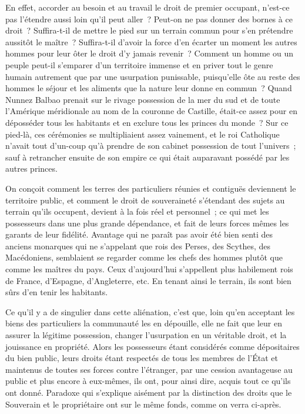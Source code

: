 \documentclass[french,twoside]{book} %
\begin{document}
En effet, accorder au besoin et au travail le droit de premier occupant, n’est-ce pas l’étendre aussi loin qu’il peut aller ? Peut-on ne pas donner des bornes à ce droit ? Suffira-t-il de mettre le pied sur un terrain commun pour s’en prétendre aussitôt le maître ? Suffira-t-il d’avoir la force d’en écarter un moment les autres hommes pour leur ôter le droit d’y jamais revenir ? Comment un homme ou un peuple peut-il s’emparer d’un territoire immense et en priver tout le genre humain autrement que par une usurpation punissable, puisqu’elle ôte au reste des hommes le séjour et les aliments que la nature leur donne en commun ? Quand Nunnez Balbao prenait sur le rivage possession de la mer du sud et de toute l’Amérique méridionale au nom de la couronne de Castille, était-ce assez pour en déposséder tous les habitants et en exclure tous les princes du monde ? Sur ce pied-là, ces cérémonies se multipliaient assez vainement, et le roi Catholique n’avait tout d’un-coup qu’à prendre de son cabinet possession de tout l’univers ; sauf à retrancher ensuite de son empire ce qui était auparavant possédé par les autres princes.\par
On conçoit comment les terres des particuliers réunies et contiguës deviennent le territoire public, et comment le droit de souveraineté s’étendant des sujets au terrain qu’ils occupent, devient à la fois réel et personnel ; ce qui met les possesseurs dans une plus grande dépendance, et fait de leurs forces mêmes les garants de leur fidélité. Avantage qui ne paraît pas avoir été bien senti des anciens monarques qui ne s’appelant que rois des Perses, des Scythes, des Macédoniens, semblaient se regarder comme les chefs des hommes plutôt que comme les maîtres du pays. Ceux d’aujourd’hui s’appellent plus habilement rois de France, d’Espagne, d’Angleterre, etc. En tenant ainsi le terrain, ils sont bien sûrs d’en tenir les habitants.\par
Ce qu’il y a de singulier dans cette aliénation, c’est que, loin qu’en acceptant les biens des particuliers la communauté les en dépouille, elle ne fait que leur en assurer la légitime possession, changer l’usurpation en un véritable droit, et la jouissance en propriété. Alors les possesseurs étant considérés comme dépositaires du bien public, leurs droits étant respectés de tous les membres de l’État et maintenus de toutes ses forces contre l’étranger, par une cession avantageuse au public et plus encore à eux-mêmes, ils ont, pour ainsi dire, acquis tout ce qu’ils ont donné. Paradoxe qui s’explique aisément par la distinction des droits que le Souverain et le propriétaire ont sur le même fonds, comme on verra ci-après.\par
\end{document}

